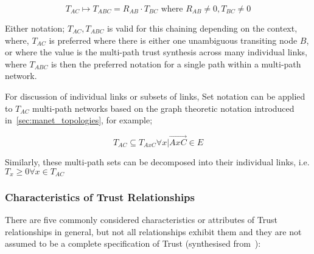 \begin{equation}
	\label{eq:trust_chain}
	T_ {AC}\mapsto T_{ABC} = R_{AB} \cdot T_{BC} \text{ where } R_{AB} \neq 0 , T_{BC} \neq 0
\end{equation}

Either notation; $T_{AC}, T_{ABC}$ is valid for this chaining depending on the context, where, $T_{AC}$ is preferred where there is either one unambiguous transiting node $B$, or where the value is the multi-path trust synthesis across many individual links, where $T_{ABC}$ is then the preferred notation for a single path within a multi-path network.

For discussion of individual links or subsets of links, Set notation can be applied to $T_{AC}$ multi-path networks based on the graph theoretic notation introduced in~\autoref{sec:manet_topologies}, for example;

\begin{equation}
	T_{AC} \subseteq T_{AxC} \forall x | \overrightarrow{AxC} \in E
\end{equation}

Similarly, these multi-path sets can be decomposed into their individual links, i.e. $T_x \ge 0 \forall x \in T_{AC}$
\subsubsection{Characteristics of Trust Relationships}

There are five commonly considered characteristics or attributes of Trust relationships in general, but not all relationships exhibit them and they are not assumed to be a complete specification of Trust (synthesised from~\cite{Liu2006,Mayer1995, Mcknight1996, Pavan2015}):

